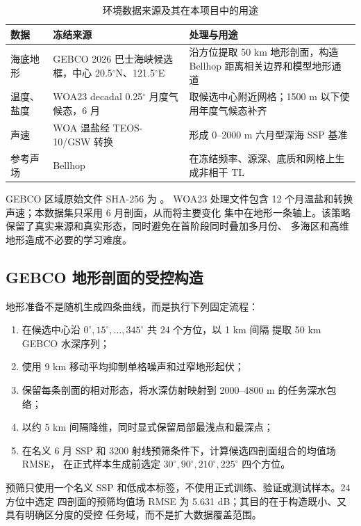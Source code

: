 \documentclass[UTF8,11pt]{ctexart}
\begin{document}
\begin{table}[H]
\centering
\caption{环境数据来源及其在本项目中的用途}
\begin{tabularx}{\textwidth}{L{3.1cm}L{4.2cm}Y}
\toprule
数据 & 冻结来源 & 处理与用途 \\
\midrule
海底地形 & GEBCO 2026 巴士海峡候选框，中心 20.5$^\circ$N、121.5$^\circ$E &
沿方位提取 50 km 地形剖面，构造 Bellhop 距离相关边界和模型地形通道 \\
温度、盐度 & WOA23 decadal 0.25$^\circ$ 月度气候态，6 月 &
取候选中心附近网格；1500 m 以下使用年度气候态补齐 \\
声速 & WOA 温盐经 TEOS-10/GSW 转换 &
形成 0--2000 m 六月型深海 SSP 基准 \\
参考声场 & Bellhop &
在冻结频率、源深、底质和网格上生成非相干 TL \\
\bottomrule
\end{tabularx}
\end{table}

GEBCO 区域原始文件 SHA-256 为
。
WOA23 处理文件包含 12 个月温盐和转换声速；本数据集只采用 6 月剖面，从而将主要变化
集中在地形一条轴上。该策略保留了真实来源和真实形态，同时避免在首阶段同时叠加多月份、
多海区和高维地形造成不必要的学习难度。

\subsection{GEBCO 地形剖面的受控构造}

地形准备不是随机生成四条曲线，而是执行下列固定流程：
\begin{enumerate}
  \item 在候选中心沿 $0^\circ,15^\circ,\ldots,345^\circ$ 共 24 个方位，以 1 km 间隔
  提取 50 km GEBCO 水深序列；
  \item 使用 9 km 移动平均抑制单格噪声和过窄地形起伏；
  \item 保留每条剖面的相对形态，将水深仿射映射到 2000--4800 m 的任务深水包络；
  \item 以约 5 km 间隔降维，同时显式保留局部最浅点和最深点；
  \item 在名义 6 月 SSP 和 3200 射线预筛条件下，计算候选四剖面组合的均值场 RMSE，
  在正式样本生成前选定 $30^\circ,90^\circ,210^\circ,225^\circ$ 四个方位。
\end{enumerate}

预筛只使用一个名义 SSP 和低成本标签，不使用正式训练、验证或测试样本。24 方位中选定
四剖面的预筛均值场 RMSE 为 5.631 dB；其目的在于构造既小、又具有明确区分度的受控
任务域，而不是扩大数据覆盖范围。
\end{document}
